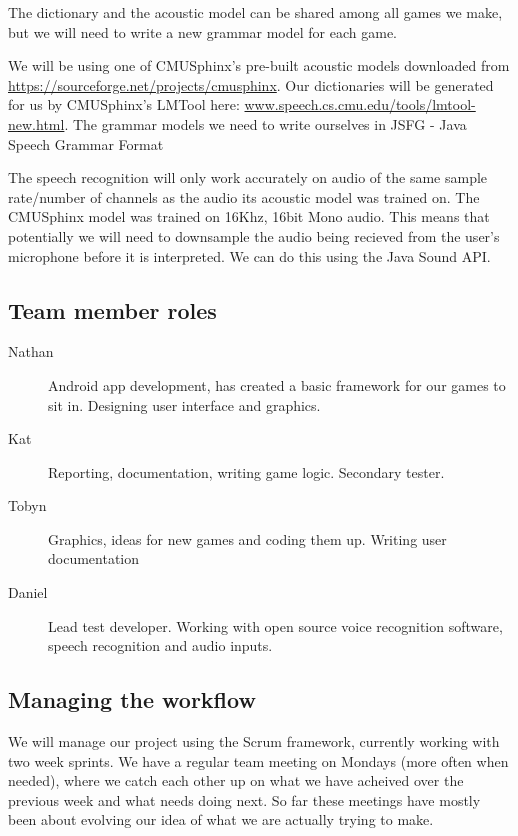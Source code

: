 \documentclass[11pt, oneside]{article}
\begin{document}
The dictionary and the acoustic model can be shared among all games we make, but we
will need to write a new grammar model for each game.

We will be using one of CMUSphinx's pre-built acoustic models downloaded from \url{https://sourceforge.net/projects/cmusphinx}. Our dictionaries will be generated for us by CMUSphinx's LMTool here: \url{www.speech.cs.cmu.edu/tools/lmtool-new.html}. The grammar models we need to write ourselves in JSFG - Java Speech Grammar Format

The speech recognition will only work accurately on audio of the same sample rate/number of channels 
as the audio its acoustic model was trained on. The CMUSphinx model was trained on 16Khz, 16bit Mono
audio. This means that potentially we will need to downsample the audio being recieved from the user's
microphone before it is interpreted. We can do this using the Java Sound API.


\subsection*{Team member roles}

\begin{description}
\item [Nathan] Android app development, has created a basic framework
  for our games to sit in. Designing user interface and graphics.
\item [Kat] Reporting, documentation, writing game logic. Secondary tester.
\item [Tobyn] Graphics, ideas for new games and coding them
  up. Writing user documentation
\item [Daniel] Lead test developer. Working with open source voice
  recognition software, speech recognition and audio inputs.
\end{description}


\subsection*{Managing the workflow}

We will manage our project using the Scrum framework, currently
working with two week sprints. We have a regular team meeting on
Mondays (more often when needed), where we catch each other up on what
we have acheived over the previous week and what needs doing next. So
far these meetings have mostly been about evolving our idea of what we
are actually trying to make.
\end{document}
